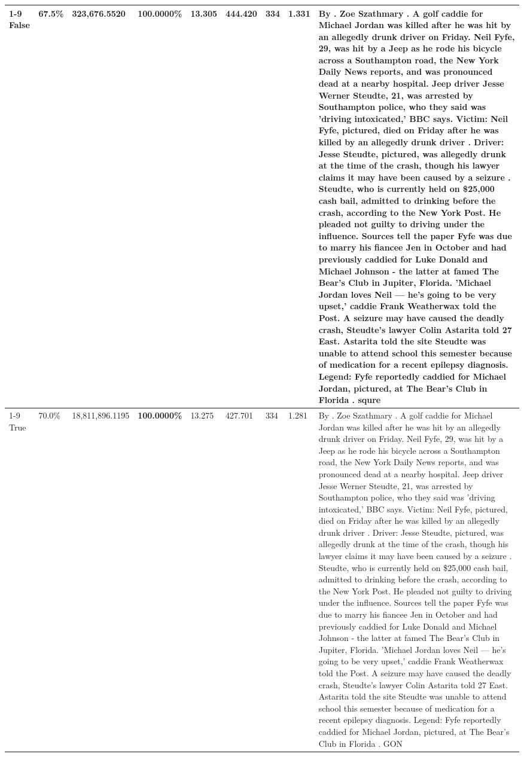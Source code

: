 \begin{table}[H]
\begin{tabular}{lllrlllll}
\cline{1-9}
False & 67.5\% & 323,676.5520 & \bfseries \color{red} 100.0000\% & 13.305 & 444.420 & 334 & 1.331 & By . Zoe Szathmary . A golf caddie for Michael Jordan was killed after he was hit by an allegedly drunk driver on Friday. Neil Fyfe, 29, was hit by a Jeep as he rode his bicycle across a Southampton road, the New York Daily News reports, and was pronounced dead at a nearby hospital. Jeep driver Jesse Werner Steudte, 21, was arrested by Southampton police, who they said was 'driving intoxicated,' BBC says. Victim: Neil Fyfe, pictured, died on Friday after he was killed by an allegedly drunk driver . Driver: Jesse Steudte, pictured, was allegedly drunk at the time of the crash, though his lawyer claims it may have been caused by a seizure . Steudte, who is currently held on \$25,000 cash bail, admitted to drinking before the crash, according to the New York Post. He pleaded not guilty to driving under the influence. Sources tell the paper Fyfe was due to marry his fiancee Jen in October and had previously caddied for Luke Donald and Michael Johnson - the latter at famed The Bear's Club in Jupiter, Florida. 'Michael Jordan loves Neil — he’s going to be very upset,' caddie Frank Weatherwax told the Post. A seizure may have caused the deadly crash, Steudte's lawyer Colin Astarita told 27 East. Astarita told the site Steudte was unable to attend school this semester because of medication for a recent epilepsy diagnosis. Legend: Fyfe reportedly caddied for Michael Jordan, pictured, at The Bear's Club in Florida . squre \\
\cline{1-9}
True & 70.0\% & 18,811,896.1195 & \bfseries \color{red} 100.0000\% & 13.275 & 427.701 & 334 & 1.281 & By . Zoe Szathmary . A golf caddie for Michael Jordan was killed after he was hit by an allegedly drunk driver on Friday. Neil Fyfe, 29, was hit by a Jeep as he rode his bicycle across a Southampton road, the New York Daily News reports, and was pronounced dead at a nearby hospital. Jeep driver Jesse Werner Steudte, 21, was arrested by Southampton police, who they said was 'driving intoxicated,' BBC says. Victim: Neil Fyfe, pictured, died on Friday after he was killed by an allegedly drunk driver . Driver: Jesse Steudte, pictured, was allegedly drunk at the time of the crash, though his lawyer claims it may have been caused by a seizure . Steudte, who is currently held on \$25,000 cash bail, admitted to drinking before the crash, according to the New York Post. He pleaded not guilty to driving under the influence. Sources tell the paper Fyfe was due to marry his fiancee Jen in October and had previously caddied for Luke Donald and Michael Johnson - the latter at famed The Bear's Club in Jupiter, Florida. 'Michael Jordan loves Neil — he’s going to be very upset,' caddie Frank Weatherwax told the Post. A seizure may have caused the deadly crash, Steudte's lawyer Colin Astarita told 27 East. Astarita told the site Steudte was unable to attend school this semester because of medication for a recent epilepsy diagnosis. Legend: Fyfe reportedly caddied for Michael Jordan, pictured, at The Bear's Club in Florida . GON \\

\end{tabular}
\end{table}
